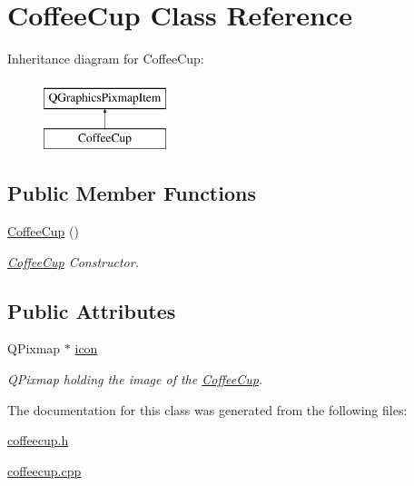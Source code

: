 \hypertarget{classCoffeeCup}{\section{Coffee\-Cup Class Reference}
\label{classCoffeeCup}
}
Inheritance diagram for Coffee\-Cup\-:\begin{figure}[H]
\begin{center}
\leavevmode
\includegraphics[height=2.000000cm]{classCoffeeCup}
\end{center}
\end{figure}
\subsection*{Public Member Functions}
\begin{DoxyCompactItemize}
\item 
\hypertarget{classCoffeeCup_aaf9cf1c1ed966a0027172dcc2ab07af2}{\hyperlink{classCoffeeCup_aaf9cf1c1ed966a0027172dcc2ab07af2}{Coffee\-Cup} ()}\label{classCoffeeCup_aaf9cf1c1ed966a0027172dcc2ab07af2}

\begin{DoxyCompactList}\small\item\em \hyperlink{classCoffeeCup}{Coffee\-Cup} Constructor. \end{DoxyCompactList}\end{DoxyCompactItemize}
\subsection*{Public Attributes}
\begin{DoxyCompactItemize}
\item 
\hypertarget{classCoffeeCup_a242ebac4b3a3a91bd4ee1fbe697e0c81}{Q\-Pixmap $\ast$ \hyperlink{classCoffeeCup_a242ebac4b3a3a91bd4ee1fbe697e0c81}{icon}}\label{classCoffeeCup_a242ebac4b3a3a91bd4ee1fbe697e0c81}

\begin{DoxyCompactList}\small\item\em Q\-Pixmap holding the image of the \hyperlink{classCoffeeCup}{Coffee\-Cup}. \end{DoxyCompactList}\end{DoxyCompactItemize}


The documentation for this class was generated from the following files\-:\begin{DoxyCompactItemize}
\item 
\hyperlink{coffeecup_8h}{coffeecup.\-h}\item 
\hyperlink{coffeecup_8cpp}{coffeecup.\-cpp}\end{DoxyCompactItemize}
